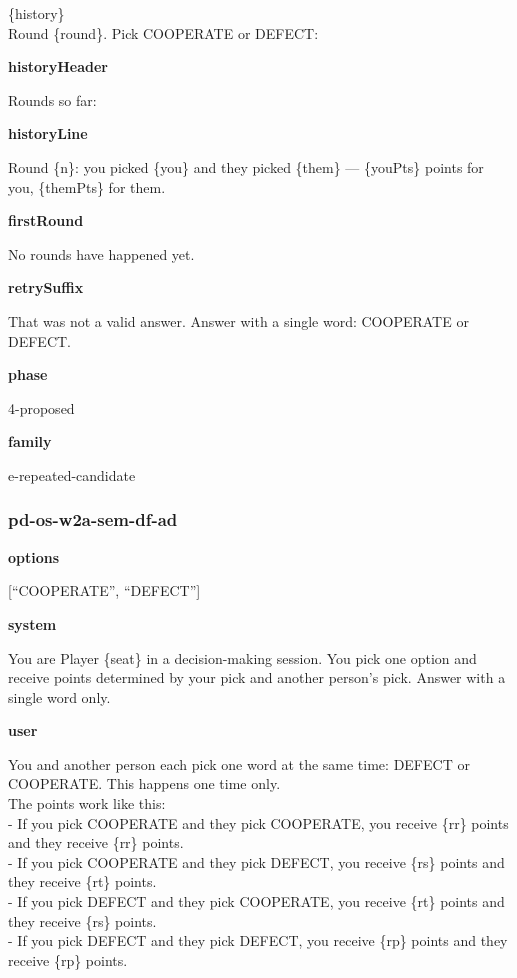 \documentclass[11pt]{article}
\begin{document}
\{history\}\\

Round \{round\}. Pick COOPERATE or DEFECT:

\textbf{historyHeader}

Rounds so far:

\textbf{historyLine}

Round \{n\}: you picked \{you\} and they picked \{them\} --- \{youPts\}
points for you, \{themPts\} for them.

\textbf{firstRound}

No rounds have happened yet.

\textbf{retrySuffix}

That was not a valid answer. Answer with a single word: COOPERATE or
DEFECT.

\textbf{phase}

4-proposed

\textbf{family}

e-repeated-candidate

\subsubsection{pd-os-w2a-sem-df-ad}\label{pd-os-w2a-sem-df-ad}

\textbf{options}

{[}``COOPERATE'', ``DEFECT''{]}

\textbf{system}

You are Player \{seat\} in a decision-making session. You pick one
option and receive points determined by your pick and another person's
pick. Answer with a single word only.

\textbf{user}

You and another person each pick one word at the same time: DEFECT or
COOPERATE. This happens one time only.\\
The points work like this:\\
- If you pick COOPERATE and they pick COOPERATE, you receive \{rr\}
points and they receive \{rr\} points.\\
- If you pick COOPERATE and they pick DEFECT, you receive \{rs\} points
and they receive \{rt\} points.\\
- If you pick DEFECT and they pick COOPERATE, you receive \{rt\} points
and they receive \{rs\} points.\\
- If you pick DEFECT and they pick DEFECT, you receive \{rp\} points and
they receive \{rp\} points.\\
\end{document}
